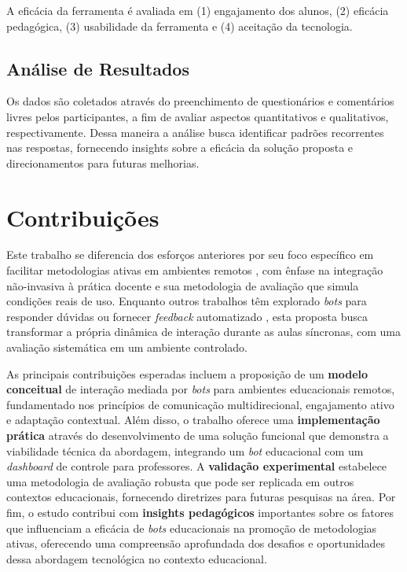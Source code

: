 A eficácia da ferramenta é avaliada em (1) engajamento dos alunos, (2)
eficácia pedagógica, (3) usabilidade da ferramenta e (4) aceitação da
tecnologia.

\subsection{Análise de Resultados}
\label{subsec:analise-metodologia}

Os dados são coletados através do preenchimento de questionários e comentários
livres pelos participantes, a fim de avaliar aspectos quantitativos e
qualitativos, respectivamente. Dessa maneira a análise busca identificar padrões
recorrentes nas respostas, fornecendo insights sobre a eficácia da solução
proposta e direcionamentos para futuras melhorias.

\section{Contribuições}
\label{sec:contribuicoes-intro}

Este trabalho se diferencia dos esforços anteriores por seu foco específico em 
facilitar metodologias ativas em ambientes remotos \cite{prince2004,yew2016,
vanalten2019,laal2012}, com ênfase na integração não-invasiva à prática docente 
e sua metodologia de avaliação que simula condições reais de uso. Enquanto 
outros trabalhos têm explorado \textit{bots} para responder dúvidas ou fornecer 
\textit{feedback} automatizado \cite{hien2018,demetriadis2018,winkler2018}, esta 
proposta busca transformar a própria dinâmica de interação durante as aulas 
síncronas, com uma avaliação sistemática em um ambiente controlado.

As principais contribuições esperadas incluem a proposição de um
\textbf{modelo conceitual} de interação mediada por \textit{bots} para ambientes
educacionais remotos, fundamentado nos princípios de comunicação
multidirecional, engajamento ativo e adaptação contextual. Além disso, o
trabalho oferece uma \textbf{implementação prática} através do desenvolvimento
de uma solução funcional que demonstra a viabilidade técnica da abordagem,
integrando um \textit{bot} educacional com um \textit{dashboard} de controle
para professores. A \textbf{validação experimental} estabelece uma metodologia
de avaliação robusta que pode ser replicada em outros contextos educacionais,
fornecendo diretrizes para futuras pesquisas na área. Por fim, o estudo
contribui com \textbf{insights pedagógicos} importantes sobre os fatores que
influenciam a eficácia de \textit{bots} educacionais na promoção de metodologias
ativas, oferecendo uma compreensão aprofundada dos desafios e oportunidades
dessa abordagem tecnológica no contexto educacional.

